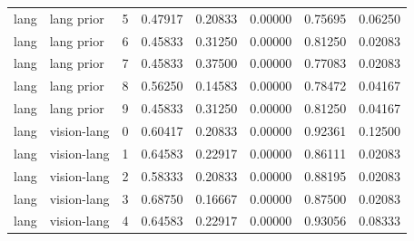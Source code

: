 \documentclass{article}
\begin{document}
\begin{center}
\begin{longtable}{llllllll}
lang & lang prior & 5 & 0.47917 & 0.20833 & 0.00000 & 0.75695 & 0.06250 \\
lang & lang prior & 6 & 0.45833 & 0.31250 & 0.00000 & 0.81250 & 0.02083 \\
lang & lang prior & 7 & 0.45833 & 0.37500 & 0.00000 & 0.77083 & 0.02083 \\
lang & lang prior & 8 & 0.56250 & 0.14583 & 0.00000 & 0.78472 & 0.04167 \\
lang & lang prior & 9 & 0.45833 & 0.31250 & 0.00000 & 0.81250 & 0.04167 \\
lang & vision-lang & 0 & 0.60417 & 0.20833 & 0.00000 & 0.92361 & 0.12500 \\
lang & vision-lang & 1 & 0.64583 & 0.22917 & 0.00000 & 0.86111 & 0.02083 \\
lang & vision-lang & 2 & 0.58333 & 0.20833 & 0.00000 & 0.88195 & 0.02083 \\
lang & vision-lang & 3 & 0.68750 & 0.16667 & 0.00000 & 0.87500 & 0.02083 \\
lang & vision-lang & 4 & 0.64583 & 0.22917 & 0.00000 & 0.93056 & 0.08333 \\
\bottomrule
\end{longtable}
\renewcommand{\arraystretch}{1.0}
\end{center}
\end{document}
